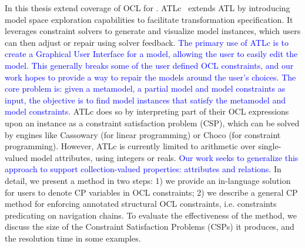 In this thesis extend coverage of OCL for \atlc.
ATLc~\cite{Le_Calvar2021-solvers} extends ATL by introducing model space exploration capabilities to facilitate transformation specification. It leverages constraint solvers to generate and visualize model instances, which users can then adjust or repair using solver feedback.
\textcolor{blue}{
The primary use of ATLc is to create a Graphical User Interface for a model, allowing the user to easily edit the model. This generally breaks some of the user defined OCL constraints, and our work hopes to provide a way to repair the models around the user's choices.
}
\textcolor{blue}{
The core problem is: given a metamodel, a partial model and model constraints as input, the objective is to find model instances that satisfy the metamodel and model constraints.
}
ATLc does so by interpreting part of their OCL expressions upon an instance as a constraint satisfaction problem (CSP), which can be solved by engines like Cassowary (for linear programming) or Choco (for constraint programming). 
However, ATLc is currently limited to arithmetic over single-valued model attributes, using integers or reals.
\textcolor{blue}{
Our work seeks to generalize this approach to support collection-valued properties: attributes and relations.
}
In detail, we present a method in two steps: 1) we provide an in-language solution for users to denote CP variables in OCL constraints; 2)  %
we describe a general CP method for enforcing annotated structural OCL constraints, i.e. constraints predicating on navigation chains. 
To evaluate the effectiveness of the method, we discuss the size of the Constraint Satisfaction Problems (CSPs) it produces, and the resolution time in some examples.


